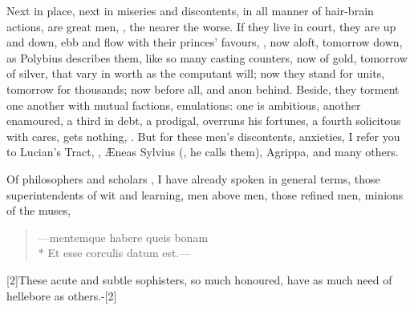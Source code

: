 Next in place, next in miseries and discontents, in all manner of
hair-brain actions, are great men, , the
nearer the worse. If they live in court, they are up and down, ebb and
flow with their princes' favours, ,
now aloft, tomorrow down, as Polybius describes them, like so many
casting counters, now of gold, tomorrow of silver, that vary in worth
as the computant will; now they stand for units, tomorrow for
thousands; now before all, and anon behind. Beside, they torment one
another with mutual factions, emulations: one is ambitious, another
enamoured, a third in debt, a prodigal, overruns his fortunes, a fourth
solicitous with cares, gets nothing, \etc{}. But for these men's
discontents, anxieties, I refer you to Lucian's Tract, , \AE{}neas Sylvius (, he
calls them), Agrippa, and many others.

Of philosophers and scholars , I have
already spoken in general terms, those superintendents of wit and
learning, men above men, those refined men, minions of the muses,
%
\begin{verse}
---mentemque habere queis bonam\\*
Et esse corculis datum est.---
\end{verse}

[2\baselineskip]These acute and subtle sophisters, so much honoured, have as much
need of hellebore as others.-[2\baselineskip]

